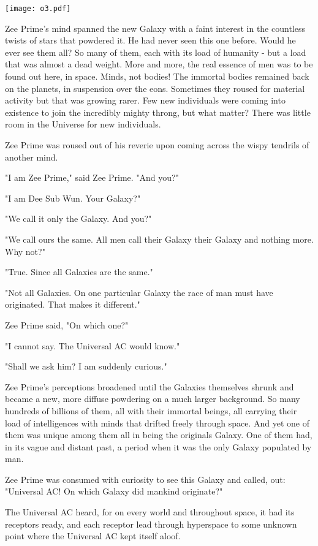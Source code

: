 \documentclass[11pt,twocolumn,paper=a5,pagesize]{article}
\newcommand{\futurethree}[1]{ #1 }
\newcommand{\sepc}[0]{\vspace{.6cm} {\centering 

\texttt{[image: o3.pdf]}

}\vspace{.6cm}}
\newcommand{\initial}[1]{ \lettrine[lines=3,lhang=0.3,nindent=0em]{  {\textsf{#1}}}{}}
\begin{document}
\sepc{}

\futurethree{
\initial{Z}ee Prime's mind spanned the new Galaxy with a faint interest in the countless twists of stars that powdered it. He had never seen this one before. Would he ever see them all? So many of them, each with its load of humanity - but a load that was almost a dead weight. More and more, the real essence of men was to be found out here, in space.
Minds, not bodies! The immortal bodies remained back on the planets, in suspension over the eons. Sometimes they roused for material activity but that was growing rarer. Few new individuals were coming into existence to join the incredibly mighty throng, but what matter? There was little room in the Universe for new individuals.

Zee Prime was roused out of his reverie upon coming across the wispy tendrils of another mind.

"I am Zee Prime," said Zee Prime. "And you?"

"I am Dee Sub Wun. Your Galaxy?"

"We call it only the Galaxy. And you?"

"We call ours the same. All men call their Galaxy their Galaxy and nothing more. Why not?"

"True. Since all Galaxies are the same."

"Not all Galaxies. On one particular Galaxy the race of man must have originated. That makes it different."

Zee Prime said, "On which one?"

"I cannot say. The Universal AC would know."

"Shall we ask him? I am suddenly curious."

Zee Prime's perceptions broadened until the Galaxies themselves shrunk and became a new, more diffuse powdering on a much larger background. So many hundreds of billions of them, all with their immortal beings, all carrying their load of intelligences with minds that drifted freely through space. And yet one of them was unique among them all in being the originals Galaxy. One of them had, in its vague and distant past, a period when it was the only Galaxy populated by man.

Zee Prime was consumed with curiosity to see this Galaxy and called, out: "Universal AC! On which Galaxy did mankind originate?"

The Universal AC heard, for on every world and throughout space, it had its receptors ready, and each receptor lead through hyperspace to some unknown point where the Universal AC kept itself aloof.

}
\end{document}

